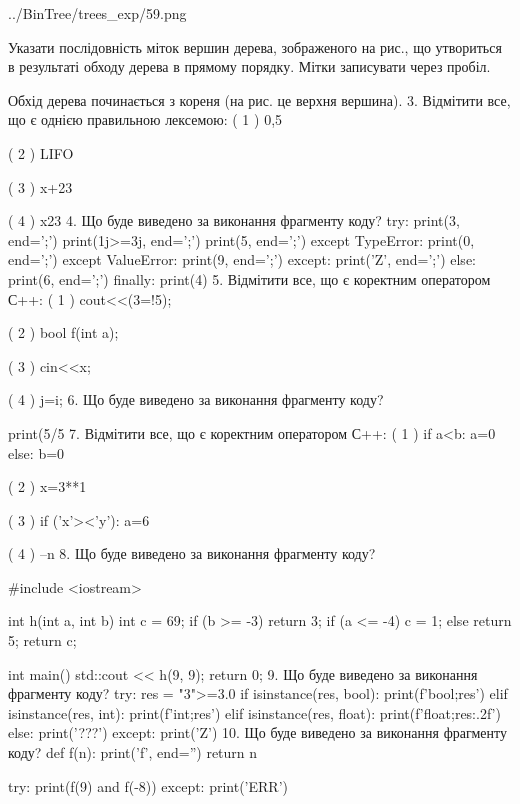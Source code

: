\documentclass[11pt]{article}
\begin{document}
\begin{center}
	{../BinTree/trees_exp/59.png}
\end{center}
Указати послідовність міток вершин дерева, зображеного на рис., що утвориться в результаті обходу дерева в прямому порядку. Мітки записувати через пробіл.\par Обхід дерева починається з кореня (на рис. це верхня вершина).
\vspace{5mm}
3. %
Відмітити все, що є однією правильною лексемою:
( 1 ) 0,5

( 2 ) LIFO

( 3 ) x+23

( 4 ) x23
\vspace{5mm}
4. Що буде виведено за виконання фрагменту коду?
try:
    print(3, end=';')
    print(1j>=3j, end=';')
    print(5, end=';')
except TypeError:
    print(0, end=';')
except ValueError:
    print(9, end=';')
except:
    print('Z', end=';')
else:
    print(6, end=';')
finally:
    print(4)
\vspace{5mm}
5. %
Відмітити все, що є коректним оператором С++:
( 1 ) cout<<(3=!5);

( 2 ) bool f(int a);

( 3 ) cin<<x;

( 4 ) j=i;
\vspace{5mm}
6. Що буде виведено за виконання фрагменту коду?

print(5/5%
\vspace{5mm}
7. %
Відмітити все, що є коректним оператором С++:
( 1 ) if a<b: a=0 else: b=0

( 2 ) x=3**1

( 3 ) if ('x'><'y'): a=6

( 4 ) --n
\vspace{5mm}
8. Що буде виведено за виконання фрагменту коду?

#include <iostream>

int h(int a, int b){
    int c = 69;
    if (b >= -3)
        return 3;
    if (a <= -4)
         c = 1;
    else 
        return 5;
    return c;
}

int main(){
    std::cout << h(9, 9);
    return 0;
}
\vspace{5mm}
9. Що буде виведено за виконання фрагменту коду?
try:
    res = "3">=3.0
    if isinstance(res, bool):
        print(f'bool;{res}')
    elif isinstance(res, int):
        print(f'int;{res}')
    elif isinstance(res, float):
        print(f'float;{res:.2f}')
    else:
        print('???')
except:
    print('Z')
\vspace{5mm}
10. Що буде виведено за виконання фрагменту коду?
def f(n):
    print('f', end='')
    return n

try:
    print(f(9) and f(-8))
except:
    print('ERR')
\vspace{5mm}










\newpage
\end{document}
